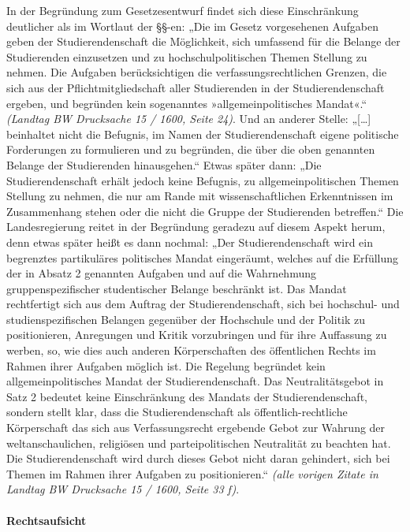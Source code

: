 \documentclass[
10pt,
a4paper,
twoside,								%
titlepage=false,							%
draft=false								%
]{scrartcl}
\begin{document}
In der Begründung zum Gesetzesentwurf findet sich diese Einschränkung deutlicher als im Wortlaut der §§-en: „Die im Gesetz vorgesehenen Aufgaben geben der Studierendenschaft die Möglichkeit, sich umfassend für die Belange der Studierenden einzusetzen und zu hochschulpolitischen Themen Stellung zu nehmen. Die Aufgaben berücksichtigen die verfassungsrechtlichen Grenzen, die sich aus der Pflichtmitgliedschaft aller Studierenden in der Studierendenschaft ergeben, und begründen kein sogenanntes »allgemeinpolitisches Mandat«.“ \textit{(Landtag BW Drucksache 15 / 1600, Seite 24)}. Und an anderer Stelle: „[…] beinhaltet nicht die Befugnis, im Namen der Studierendenschaft eigene politische Forderungen zu formulieren und zu begründen, die über die oben genannten Belange der Studierenden hinausgehen.“ Etwas später dann: „Die Studierendenschaft erhält jedoch keine Befugnis, zu allgemeinpolitischen Themen Stellung zu nehmen, die nur am Rande mit wissenschaftlichen Erkenntnissen im Zusammenhang stehen oder die nicht die Gruppe der Studierenden betreffen.“ Die Landesregierung reitet in der Begründung geradezu auf diesem Aspekt herum, denn etwas später heißt es dann nochmal: „Der Studierendenschaft wird ein begrenztes partikuläres politisches Mandat eingeräumt, welches auf die Erfüllung der in Absatz 2 genannten Aufgaben und auf die Wahrnehmung gruppenspezifischer studentischer Belange beschränkt ist. Das Mandat rechtfertigt sich aus dem Auftrag der Studierendenschaft, sich bei hochschul- und studienspezifischen Belangen gegenüber der Hochschule und der Politik zu positionieren, Anregungen und Kritik vorzubringen und für ihre Auffassung zu werben, so, wie dies auch anderen Körperschaften des öffentlichen Rechts im Rahmen ihrer Aufgaben möglich ist. Die Regelung begründet kein allgemeinpolitisches Mandat der Studierendenschaft. Das Neutralitätsgebot in Satz 2 bedeutet keine Einschränkung des Mandats der Studierendenschaft, sondern stellt klar, dass die Studierendenschaft als öffentlich-rechtliche Körperschaft das sich aus Verfassungsrecht ergebende Gebot zur Wahrung der weltanschaulichen, religiösen und parteipolitischen Neutralität zu beachten hat. Die Studierendenschaft wird durch dieses Gebot nicht daran gehindert, sich bei Themen im Rahmen ihrer Aufgaben zu positionieren.“ \textit{(alle vorigen Zitate in Landtag BW Drucksache 15 / 1600, Seite 33 f)}.



\paragraph{Rechtsaufsicht}
\end{document}
